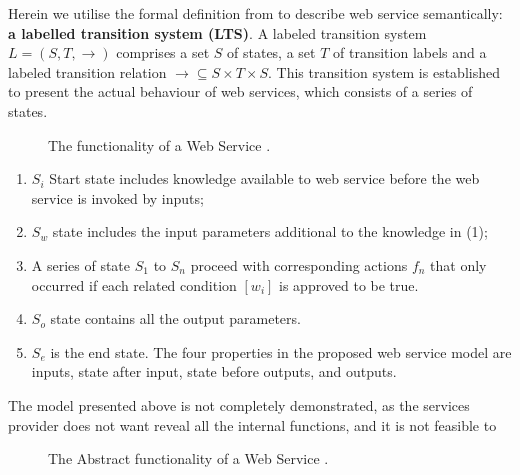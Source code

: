 Herein we utilise the formal definition from \cite{agarwal2010d5} to describe web service semantically: \textbf{a labelled transition system (LTS)}. A labeled transition system $L = (S,T,\rightarrow)$ comprises a set $S$ of states, a set $T$ of transition labels and a labeled transition relation $\rightarrow \subseteq S \times T \times S$. This transition system is established to present the actual behaviour of web services, which consists of a series of states. 

\begin{figure}
\centerline{
}
\caption{ The functionality of a Web Service \cite{agarwal2010d5}.}
\label{fig:lts}
\end{figure}


\begin{enumerate}

\item $S_i$ Start state includes knowledge available to web service before the web service is invoked by inputs; 
\item $S_w$ state includes the input parameters additional to the knowledge in (1); 
\item A series of state $S_1$ to $S_n$ proceed with corresponding actions $f_n$ that only occurred if each related condition $[w_i]$ is approved to be true. 
\item $S_o$ state contains all the output parameters. 
\item $S_e$ is the end state.  The four properties in the proposed web service model are inputs, state after input, state before outputs, and outputs. 
\end{enumerate}

The model presented above is not completely demonstrated, as the services provider does not want reveal all the internal functions, and it is not feasible to  

\begin{figure}
\centerline{
}
\caption{The Abstract functionality of a Web Service \cite{agarwalts2010d5}.}
\label{fig:absl}
\end{figure}



